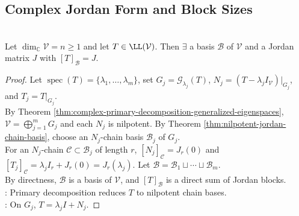 \subsection{Complex Jordan Form and Block Sizes}

\begin{theorem} \label{thm:complex-jordan-form} \\
Let $\dim_{\mathbb{C}}\mathcal{V}=n\geq1$ and let $T\in\LL(\mathcal{V})$. Then $\exists$ a basis $\mathcal{B}$ of $\mathcal{V}$ and a Jordan matrix $J$ with $[T]_{\mathcal{B}}=J$.
\begin{proof}
Let $\operatorname{spec}(T)=\{\lambda_1,\ldots,\lambda_m\}$, set $G_j=\mathcal{G}_{\lambda_j}(T)$, $N_j=(T-\lambda_jI_{\mathcal{V}})|_{G_j}$, and $T_j=T|_{G_j}$.\\
By Theorem \ref{thm:complex-primary-decomposition-generalized-eigenspaces}, $\mathcal{V}=\bigoplus\limits_{j=1}^mG_j$ and each $N_j$ is nilpotent. By Theorem \ref{thm:nilpotent-jordan-chain-basis}, choose an $N_j$-chain basis $\mathcal{B}_j$ of $G_j$.\\
For an $N_j$-chain $\mathcal{C}\subset\mathcal{B}_j$ of length $r$, $[N_j]_{\mathcal{C}}=J_r(0)$ and $[T_j]_{\mathcal{C}}=\lambda_jI_r+J_r(0)=J_r(\lambda_j)$. Let $\mathcal{B}=\mathcal{B}_1\sqcup\cdots\sqcup\mathcal{B}_m$.\\
By directness, $\mathcal{B}$ is a basis of $\mathcal{V}$, and $[T]_{\mathcal{B}}$ is a direct sum of Jordan blocks.\\
: Primary decomposition reduces $T$ to nilpotent chain bases.\\
: On $G_j$, $T=\lambda_jI+N_j$.
\end{proof}
\end{theorem}

